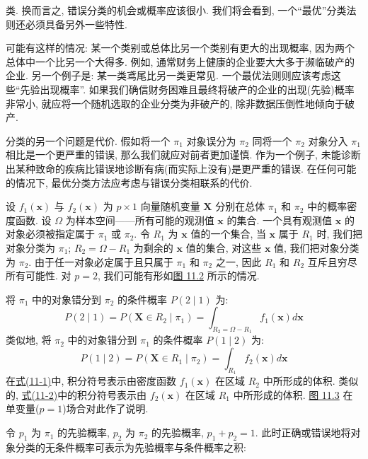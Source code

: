 
类. 换而言之, 错误分类的机会或概率应该很小. 我们将会看到, 一个“最优”分类法则还必须具备另外一些特性.

可能有这样的情况: 某一个类别或总体比另一个类别有更大的出现概率, 因为两个总体中一个比另一个大得多. 例如, 通常财务上健康的企业要大大多于濒临破产的企业. 另一个例子是: 某一类鸢尾比另一类更常见. 一个最优法则则应该考虑这些“先验出现概率”. 如果我们确信财务困难且最终将破产的企业的出现(先验)概率非常小, 就应将一个随机选取的企业分类为非破产的, 除非数据压倒性地倾向于破产.

分类的另一个问题是代价. 假如将一个 $\pi_1$ 对象误分为 $\pi_2$ 同将一个 $\pi_2$ 对象分入 $\pi_1$ 相比是一个更严重的错误, 那么我们就应对前者更加谨慎. 作为一个例子, 未能诊断出某种致命的疾病比错误地诊断有病(而实际上没有)是更严重的错误. 在任何可能的情况下, 最优分类方法应考虑与错误分类相联系的代价.

设 $f_1(\mathbf{x})$ 与 $f_2(\mathbf{x})$ 为 $p\times1$ 向量随机变量 $\mathbf{X}$ 分别在总体 $\pi_1$ 和 $\pi_2$ 中的概率密度函数. 设 $\Omega$ 为样本空间——所有可能的观测值 $\mathbf{x}$ 的集合. 一个具有观测值 $\mathbf{x}$ 的对象必须被指定属于 $\pi_1$ 或 $\pi_2$. 令 $R_1$ 为 $\mathbf{x}$ 值的一个集合, 当 $\mathbf{x}$ 属于 $R_1$ 时, 我们把对象分类为 $\pi_1$; $R_2=\Omega-R_1$ 为剩余的 $\mathbf{x}$ 值的集合, 对这些 $\mathbf{x}$ 值, 我们把对象分类为 $\pi_2$. 由于任一对象必定属于且只属于 $\pi_1$ 和 $\pi_2$ 之一, 因此 $R_1$ 和 $R_2$ 互斥且穷尽所有可能性. 对 $p=2$, 我们可能有形如\hyperref[fig:11.2]{图 11.2} 所示的情况.

\begin{mvfigure}
\label{fig:11.2}
\end{mvfigure}

将 $\pi_1$ 中的对象错分到 $\pi_2$ 的条件概率 $P(2\mid1)$ 为:
\label{eq:11-1}
\begin{equation}
P(2\mid1)=P(\mathbf{X}\in R_2\mid\pi_1)=\int_{R_2=\Omega-R_1}f_1(\mathbf{x})d\mathbf{x}
\tag{11-1}
\end{equation}
类似地, 将 $\pi_2$ 中的对象错分到 $\pi_1$ 的条件概率 $P(1\mid2)$ 为:
\label{eq:11-2}
\begin{equation}
P(1\mid2)=P(\mathbf{X}\in R_1\mid\pi_2)=\int_{R_1}f_2(\mathbf{x})d\mathbf{x}
\tag{11-2}
\end{equation}
在\hyperref[eq:11-1]{式(11-1)}中, 积分符号表示由密度函数 $f_1(\mathbf{x})$ 在区域 $R_2$ 中所形成的体积. 类似的, \hyperref[eq:11-2]{式(11-2)}中的积分符号表示由 $f_2(\mathbf{x})$ 在区域 $R_1$ 中所形成的体积. \hyperref[fig:11.3]{图 11.3} 在单变量($p=1$)场合对此作了说明.

\begin{mvfigure}
\label{fig:11.3}
\end{mvfigure}

令 $p_1$ 为 $\pi_1$ 的先验概率, $p_2$ 为 $\pi_2$ 的先验概率, $p_1+p_2=1$. 此时正确或错误地将对象分类的无条件概率可表示为先验概率与条件概率之积:
